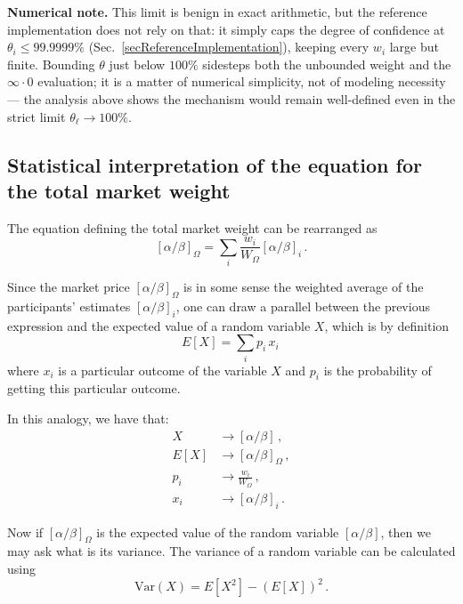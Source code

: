 \documentclass[letterpaper]{article}
\newcommand{\priceAB}{\left[\alpha / \beta\right]}
\begin{document}
\textbf{Numerical note.} This limit is benign in exact arithmetic, but the reference implementation does not rely on that: it simply caps the degree of confidence at $\theta_i \leq 99.9999\%$ (Sec.~\ref{secReferenceImplementation}), keeping every $w_i$ large but finite. Bounding $\theta$ just below $100\%$ sidesteps both the unbounded weight and the $\infty \cdot 0$ evaluation; it is a matter of numerical simplicity, not of modeling necessity --- the analysis above shows the mechanism would remain well-defined even in the strict limit $\theta_\ell \to 100\%$.

\subsection{Statistical interpretation of the equation for the total market weight}\label{secStatisticalInterpretation}

The equation defining the total market weight can be rearranged as
\begin{equation*}
    \priceAB_\Omega = \sum_i \frac{w_i}{W_\Omega} \priceAB_i\,.
\end{equation*}

Since the market price $\priceAB_\Omega$ is in some sense the weighted average of the participants' estimates $\priceAB_i$, one can draw a parallel between the previous expression and the expected value of a random variable $X$, which is by definition
\begin{equation*}
    E[X] = \sum_i p_i \,x_i \,
\end{equation*}
where $x_i$ is a particular outcome of the variable $X$ and $p_i$ is the probability of getting this particular outcome.

In this analogy, we have that:
\begin{align*}
    X &\rightarrow \priceAB \, ,\\
    E[X] &\rightarrow \priceAB_\Omega \, , \\
    p_i &\rightarrow \frac{w_i}{W_\Omega} \, ,\\
    x_i &\rightarrow \priceAB_i \,.
\end{align*}

Now if $\priceAB_\Omega$ is the expected value of the random variable $\priceAB$, then we may ask what is its variance. The variance of a random variable can be calculated using
\begin{equation*}
    \mathrm{Var}(X) = E[X^2] - (E[X])^2 \, .
\end{equation*}
\end{document}
